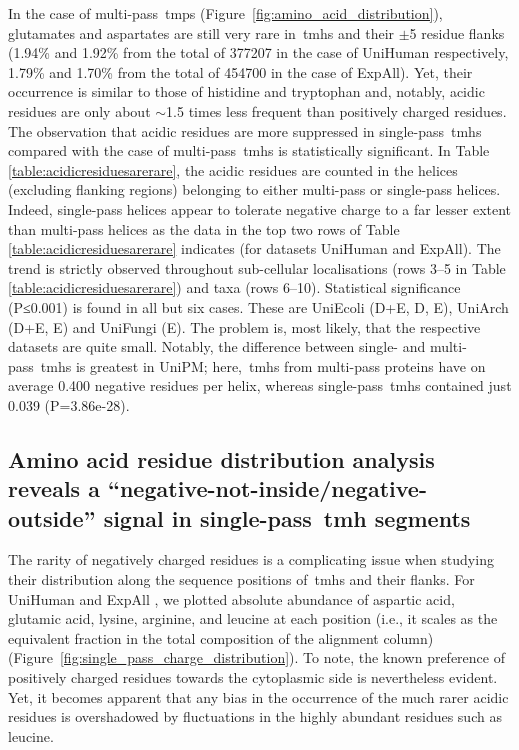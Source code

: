 In the case of multi-pass~\gls{tmp}s (Figure~\ref{fig:amino_acid_distribution}), glutamates and aspartates are still very rare in~\gls{tmh}s and their $\pm$5 residue flanks (1.94\% and 1.92\% from the total of 377207 in the case of UniHuman respectively, 1.79\% and 1.70\% from the total of 454700 in the case of ExpAll).
Yet, their occurrence is similar to those of histidine and tryptophan and, notably, acidic residues are only about $\sim$1.5 times less frequent than positively charged residues.
The observation that acidic residues are more suppressed in single-pass~\gls{tmh}s compared with the case of multi-pass~\gls{tmh}s is statistically significant.
In Table \ref{table:acidicresiduesarerare}, the acidic residues are counted in the helices (excluding flanking regions) belonging to either multi-pass or single-pass helices.
Indeed, single-pass helices appear to tolerate negative charge to a far lesser extent than multi-pass helices as the data in the top two rows of Table \ref{table:acidicresiduesarerare} indicates (for datasets UniHuman and ExpAll).
The trend is strictly observed throughout sub-cellular localisations (rows 3--5 in Table \ref{table:acidicresiduesarerare}) and taxa (rows 6--10).
Statistical significance (P≤0.001) is found in all but six cases.
These are UniEcoli (D+E, D, E), UniArch (D+E, E) and UniFungi (E).
The problem is, most likely, that the respective datasets are quite small.
Notably, the difference between single- and multi-pass~\gls{tmh}s is greatest in UniPM\@; here,~\gls{tmh}s from multi-pass proteins have on average 0.400 negative residues per helix, whereas single-pass~\gls{tmh}s contained just 0.039 (P=3.86e-28).

\subsection{Amino acid residue distribution analysis reveals a ``negative-not-inside/negative-outside'' signal in single-pass~\gls{tmh} segments}

The rarity of negatively charged residues is a complicating issue when studying their distribution along the sequence positions of~\gls{tmh}s and their flanks.
For UniHuman and ExpAll , we plotted absolute abundance of aspartic acid, glutamic acid, lysine, arginine, and leucine at each position (i.e., it scales as the equivalent fraction in the total composition of the alignment column) (Figure~\ref{fig:single_pass_charge_distribution}).
To note, the known preference of positively charged residues towards the cytoplasmic side is nevertheless evident.
Yet, it becomes apparent that any bias in the occurrence of the much rarer acidic residues is overshadowed by fluctuations in the highly abundant residues such as leucine.

